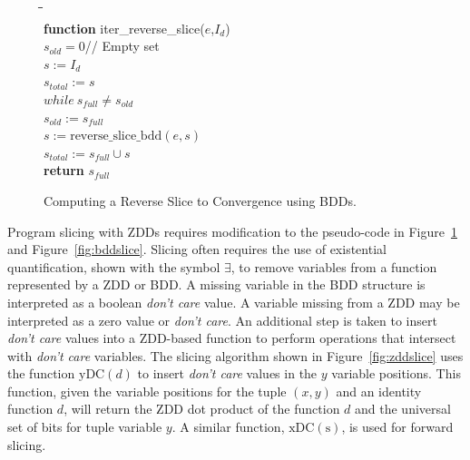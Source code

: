 \documentclass[defaultstyle,11pt]{thesis}
\begin{document}
\begin{figure}
\begin{center}
\begin{minipage}{1.5in}
\begin{tabbing}
\hspace{1em}\=\hspace{1em}\=\hspace{1em}\=\hspace{1em}\=\\
\textbf{function} iter\_reverse\_slice($e$,$I_d$)\\
\>$s_{old} = 0$// Empty set\\
\>$s := I_d$\\
\>$s_{total} := s$\\
\>$while\ s_{full} \neq s_{old} $\\
\>\>$s_{old} := s_{full}$\\
\>\>$s := \mathrm{reverse\_slice\_bdd}(e,s)$\\
\>\>$s_{total} := s_{full} \cup s$\\
\>\textbf{return} $s_{full}$
\end{tabbing}
\end{minipage}
\end{center}
\caption{Computing a Reverse Slice to Convergence using BDDs.}
\label{fig:bdditerslice}
\end{figure}

Program slicing with ZDDs requires modification to the pseudo-code in
Figure~\ref{fig:bdditerslice} and Figure~\ref{fig:bddslice}. Slicing
often requires the use of existential quantification, shown with the
symbol $\exists$, to remove variables from a function represented by a
ZDD or BDD. A missing variable in the BDD structure is interpreted as
a boolean \textit{don't care} value. A variable missing from a ZDD may
be interpreted as a zero value or \textit{don't care}.  An additional
step is taken to insert \textit{don't care} values into a ZDD-based
function to perform operations that intersect with \textit{don't care}
variables.  The slicing algorithm shown in Figure~\ref{fig:zddslice}
uses the function $\mathrm{yDC}(d)$ to insert \textit{don't care}
values in the $y$ variable positions.  This function, given the
variable positions for the tuple $(x,y)$ and an identity function $d$,
will return the ZDD dot product\cite{mishchenko:01:sc} of the function
$d$ and the universal set of bits for tuple variable $y$.  A similar
function, $\mathrm{xDC(s)}$, is used for forward slicing.
\end{document}

